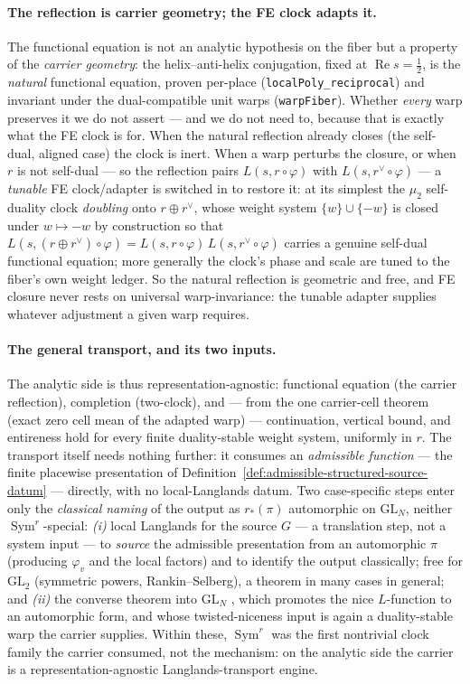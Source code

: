 \documentclass[11pt]{article}
\theoremstyle{definition}
\renewcommand{\Re}{\operatorname{Re}}
\newcommand{\Sym}{\operatorname{Sym}}
\begin{document}
\paragraph{The reflection is carrier geometry; the FE clock adapts it.} The functional equation is not an
analytic hypothesis on the fiber but a property of the \emph{carrier geometry}: the helix--anti-helix
conjugation, fixed at $\Re s=\tfrac12$, is the \emph{natural} functional equation, proven per-place
(\texttt{localPoly\_reciprocal}) and invariant under the dual-compatible unit warps (\texttt{warpFiber}).
Whether \emph{every} warp preserves it we do not assert --- and we do not need to, because that is exactly
what the FE clock is for. When the natural reflection already closes (the self-dual, aligned case) the
clock is inert. When a warp perturbs the closure, or when $r$ is not self-dual --- so the reflection pairs
$L(s,r\circ\varphi)$ with $L(s,r^\vee\circ\varphi)$ --- a \emph{tunable} FE clock/adapter is switched in to
restore it: at its simplest the $\mu_2$ self-duality clock \emph{doubling} onto $r\oplus r^\vee$, whose
weight system $\{w\}\cup\{-w\}$ is closed under $w\mapsto-w$ by construction so that
$L(s,(r\oplus r^\vee)\circ\varphi)=L(s,r\circ\varphi)\,L(s,r^\vee\circ\varphi)$ carries a genuine self-dual
functional equation; more generally the clock's phase and scale are tuned to the fiber's own weight ledger.
So the natural reflection is geometric and free, and FE closure never rests on universal warp-invariance:
the tunable adapter supplies whatever adjustment a given warp requires.

\paragraph{The general transport, and its two inputs.} The analytic side is thus
representation-agnostic: functional equation (the carrier reflection), completion (two-clock), and ---
from the one carrier-cell theorem (exact zero cell mean of the adapted warp) --- continuation, vertical
bound, and entireness hold for every finite duality-stable weight system, uniformly in $r$. The
transport itself needs nothing further: it consumes an \emph{admissible function} --- the finite
placewise presentation of Definition~\ref{def:admissible-structured-source-datum} --- directly, with
no local-Langlands datum. Two case-specific steps enter only the \emph{classical naming} of the output
as $r_*(\pi)$ automorphic on $\mathrm{GL}_N$, neither $\Sym^r$-special: \emph{(i)} local Langlands for
the source $G$ --- a translation step, not a system input --- to \emph{source} the admissible
presentation from an automorphic $\pi$ (producing $\varphi_v$ and the local factors) and to identify
the output classically; free for $\mathrm{GL}_2$ (symmetric powers, Rankin--Selberg), a theorem in
many cases in general; and \emph{(ii)} the converse theorem into $\mathrm{GL}_N$ \cite{CPS}, which
promotes the nice $L$-function to an automorphic form, and whose twisted-niceness input is again a
duality-stable warp the carrier supplies. Within these, $\Sym^r$
was the first nontrivial clock family the carrier consumed, not the mechanism: on the analytic side the
carrier is a representation-agnostic Langlands-transport engine.
\end{document}
